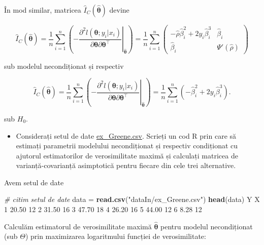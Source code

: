 \documentclass[]{article}
\newenvironment{Shaded}{\begin{snugshade}}{\end{snugshade}}
\newcommand{\KeywordTok}[1]{\textcolor[rgb]{0.13,0.29,0.53}{\textbf{#1}}}
\newcommand{\DecValTok}[1]{\textcolor[rgb]{0.00,0.00,0.81}{#1}}
\newcommand{\FloatTok}[1]{\textcolor[rgb]{0.00,0.00,0.81}{#1}}
\newcommand{\StringTok}[1]{\textcolor[rgb]{0.31,0.60,0.02}{#1}}
\newcommand{\CommentTok}[1]{\textcolor[rgb]{0.56,0.35,0.01}{\textit{#1}}}
\newcommand{\NormalTok}[1]{#1}
\newenvironment{frshaded*}{%
  \def\FrameCommand{\fboxrule=\FrameRule\fboxsep=\FrameSep \fcolorbox{framecolor}{shadecolor1}}%
  \MakeFramed {\advance\hsize-\width \FrameRestore}}%
{\endMakeFramed}
\newenvironment{rmdblock}[1]
  {\begin{frshaded*}
  \begin{itemize}
  \renewcommand{\labelitemi}{
    \raisebox{-.7\height}[0pt][0pt]{
      {\setkeys{Gin}{width=2em,keepaspectratio}\texttt{[image: images/icons/\#1]}}
    }
  }
  \item
  }
  {
  \end{itemize}
  \end{frshaded*}
  }
\newenvironment{rmdexercise}
  {\begin{rmdblock}{exercise}}
  {\end{rmdblock}}
\begin{document}
În mod similar, matricea \(\hat{I}_{C}(\hat{\boldsymbol{\theta}})\)
devine

\[
\hat{I}_{C}(\hat{\boldsymbol{\theta}}) = \frac{1}{n}\sum_{i=1}^{n}\left(-\left.\frac{\partial^2 l(\boldsymbol{\theta};y_i|x_i)}{\partial \boldsymbol{\theta}\partial \boldsymbol{\theta}^\intercal}\right\rvert_{\hat{\boldsymbol{\theta}}}\right) = \frac{1}{n}\sum_{i = 1}^{n}\begin{pmatrix} - \hat{\rho}\hat{\beta}_i^2 + 2y_i\hat{\beta}_i^3 & \hat{\beta}_i\\ \hat{\beta}_i & \Psi'(\hat{\rho})\end{pmatrix}
\]

sub modelul necondiționat și respectiv

\[
\hat{I}_{C}(\hat{\boldsymbol{\theta}}) = \frac{1}{n}\sum_{i=1}^{n}\left(-\left.\frac{\partial^2 l(\boldsymbol{\theta};y_i|x_i)}{\partial \boldsymbol{\theta}\partial \boldsymbol{\theta}^\intercal}\right\rvert_{\hat{\boldsymbol{\theta}}}\right) = \frac{1}{n}\sum_{i = 1}^{n} \left(-\hat{\beta}_i^2 + 2y_i\hat{\beta}_i^3\right).
\]

sub \(H_0\).

\begin{rmdexercise}
Considerați setul de date \href{dataIn/ex_Greene.csv}{ex\_Greene.csv}.
Scrieți un cod R prin care să estimați parametrii modelului
necondiționat și respectiv condiționat cu ajutorul estimatorilor de
verosimilitate maximă și calculați matricea de varianță-covarianță
asimptotică pentru fiecare din cele trei alternative.
\end{rmdexercise}

Avem setul de date

\begin{Shaded}
\begin{Highlighting}[]
\CommentTok{# citim setul de date}
\NormalTok{data =}\StringTok{ }\KeywordTok{read.csv}\NormalTok{(}\StringTok{"dataIn/ex_Greene.csv"}\NormalTok{)}
\KeywordTok{head}\NormalTok{(data)}
\NormalTok{      Y  X}
\DecValTok{1} \FloatTok{20.50} \DecValTok{12}
\DecValTok{2} \FloatTok{31.50} \DecValTok{16}
\DecValTok{3} \FloatTok{47.70} \DecValTok{18}
\DecValTok{4} \FloatTok{26.20} \DecValTok{16}
\DecValTok{5} \FloatTok{44.00} \DecValTok{12}
\DecValTok{6}  \FloatTok{8.28} \DecValTok{12}
\end{Highlighting}
\end{Shaded}

Calculăm estimatorul de verosimilitate maximă
\(\hat{\boldsymbol{\theta}}\) pentru modelul necondiționat (sub
\(\Theta\)) prin maximizarea logaritmului funcției de verosimilitate:
\end{document}
